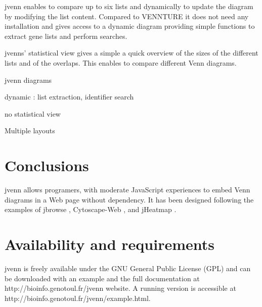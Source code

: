 \documentclass{bmcart}
\begin{document}
jvenn enables to compare up to six lists and dynamically to update the diagram
by modifying the list content. Compared to VENNTURE it does not need any
installation and gives access to a dynamic diagram providing simple functions to
extract gene lists and perform searches. 

jvenns' statistical view gives a simple a quick overview of the sizes of the
different lists and of the overlaps. This enables to compare different Venn diagrams.

jvenn diagrams 

dynamic : list extraction, identifier search 

no statistical view 

Multiple layouts 



\section*{Conclusions}

jvenn allows programers, with moderate JavaScript experiences to embed Venn
diagrams in a Web page without dependency. It has been designed following the
examples of jbrowse \cite{Westesson01032013}, Cytoscape-Web \cite{Lopes2010},
and jHeatmap \cite{DeuPons2014}.

\section*{Availability and requirements}

jvenn is freely available under the GNU General Public License (GPL) and can be
downloaded with an example and the full documentation at
http://bioinfo.genotoul.fr/jvenn  website. A running version is accessible at
http://bioinfo.genotoul.fr/jvenn/example.html.

\end{document}
